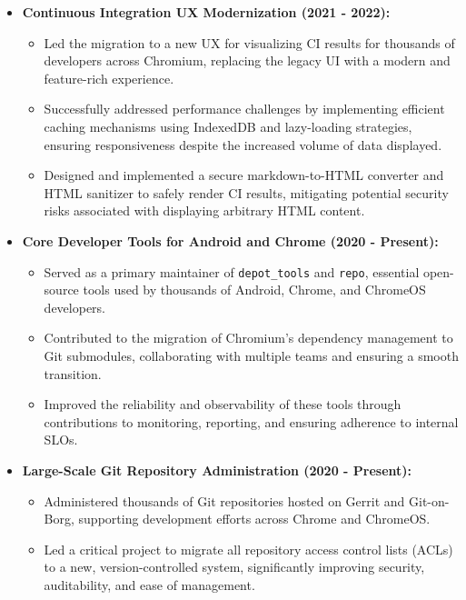 \documentclass[a4paper]{article}
\begin{document}
\begin{itemize} \itemsep 0pt
    \item \textbf{Continuous Integration UX Modernization (2021 - 2022):}
        \begin{itemize} \itemsep 2pt
            \item Led the migration to a new UX for visualizing CI results for thousands of developers across Chromium, replacing the legacy UI with a modern and feature-rich experience.
            \item Successfully addressed performance challenges by implementing efficient caching mechanisms using IndexedDB and lazy-loading strategies, ensuring responsiveness despite the increased volume of data displayed.
            \item Designed and implemented a secure markdown-to-HTML converter and HTML sanitizer to safely render CI results, mitigating potential security risks associated with displaying arbitrary HTML content.
        \end{itemize}
    \item \textbf{Core Developer Tools for Android and Chrome (2020 - Present):}
        \begin{itemize} \itemsep 2pt
            \item Served as a primary maintainer of \texttt{depot\_tools} and \texttt{repo}, essential open-source tools used by thousands of Android, Chrome, and ChromeOS developers.
            \item Contributed to the migration of Chromium's dependency management to Git submodules, collaborating with multiple teams and ensuring a smooth transition.
            \item Improved the reliability and observability of these tools through contributions to monitoring, reporting, and ensuring adherence to internal SLOs.
        \end{itemize}
    \item \textbf{Large-Scale Git Repository Administration (2020 - Present):}
        \begin{itemize} \itemsep 2pt
            \item Administered thousands of Git repositories hosted on Gerrit and Git-on-Borg, supporting development efforts across Chrome and ChromeOS.
            \item Led a critical project to migrate all repository access control lists (ACLs) to a new, version-controlled system, significantly improving security, auditability, and ease of management.
        \end{itemize}
\end{itemize}
\vspace{6mm}
\end{document}
